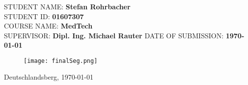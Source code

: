 \makeatletter

\begin{titlepage}
	\thispagestyle{empty}
	\vspace*{\dimexpr-1cm-\topmargin-\headsep-\headheight-\baselineskip}%
	\hspace*{\dimexpr-4cm-\evensidemargin-\parindent}%

	\begin{center}
		{\noindent \linespread{1.3} \color{header-blue} \Huge \textbf{\@title} \par }
		\vspace{5pt}
		\vspace{20pt}
	\end{center}
	\hspace{-35mm}

	\vspace{15pt}
	\tabto{2cm}STUDENT NAME: \tabto{7cm}\textbf{Stefan Rohrbacher} \\
	\tabto{2cm}STUDENT ID: \tabto{7cm}\textbf{01607307} \\
	\tabto{2cm}COURSE NAME: \tabto{7cm}\textbf{MedTech}\\
	\vspace{15pt}
	\tabto{2cm}SUPERVISOR: \tabto{7cm}\textbf{Dipl. Ing. Michael Rauter}
	\tabto{2cm}DATE OF SUBMISSION: \tabto{7cm}\textbf{\today}

	\vspace{15pt}

	\begin{figure}[h!] %
		\centerline{ %
			\texttt{[image: finalSeg.png]}}
	\end{figure}

	\vfill

	Deutschlandsberg, \today

\end{titlepage}
\makeatother

